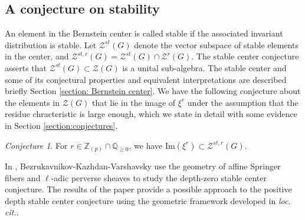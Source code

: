 \documentclass[11 pt]{article}
\numberwithin{equation}{subsection}
\theoremstyle{definition}
\theoremstyle{remark}
\theoremstyle{conjecture}
\newtheorem{conjecture}{Conjecture}[section]
\newcommand{\Z}{\mathbb Z}
\newcommand{\Q}{\mathbb Q}
\newcommand{\ZZ}{\mathcal{Z}}
\begin{document}
\subsection{A conjecture on stability}
An element in the Bernstein center is called stable if the associated invariant distribution is stable. Let $\ZZ^{st}(G)$ denote the vector subspace of stable elements in the center, and $\ZZ^{st,r}(G)=\ZZ^{st}(G)\cap \ZZ^{r}(G)$. The stable center conjecture asserts that $\ZZ^{st}(G) \subset \ZZ(G)$ is a unital sub-algebra. The stable center and some of its conjectural properties and equivalent interpretations are described briefly Section \ref{section: Bernstein center}. We have the following conjecture about the elements in $\ZZ(G)$ that lie in the image of $\xi^r$ under the assumption that the residue chracteristic is large enough, which we state in detail with some evidence in Section \ref{section:conjectures}. 
\begin{conjecture}
    For $r \in \Z_{(p)}\cap \Q_{\geq 0}$, we have $\mathrm{Im}(\xi^r)\subset \ZZ^{st,r}(G) $.
\end{conjecture}
In \cite{BKV}, Bezrukavnikov-Kazhdan-Varshavsky use the geometry of affine Springer fibers and $\ell$-adic perverse sheaves to 
study the depth-zero stable center conjecture. The results of the paper 
provide a possible  approach to the 
positive depth stable center conjecture  using the geometric framework
developed in \emph{loc. cit.}.


\end{document}
